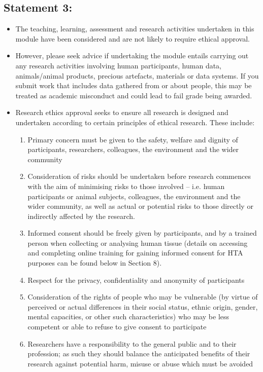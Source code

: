\documentclass{MDXHandbook}
\begin{document}
\subsection*{Statement 3:}
	\begin{itemize}
		\item The teaching, learning, assessment and research activities undertaken in this module have been considered and are not likely to require ethical approval. 
		\item However, please seek advice if undertaking the module entails carrying out any research activities involving human participants, human data, animals/animal products, precious artefacts, materials or data systems. If you submit work that includes data gathered from or about people, this may be treated as academic misconduct and could lead to fail grade being awarded. 
		\item Research ethics approval seeks to ensure all research is designed and undertaken according to certain principles of ethical research. These include: 
		\begin{enumerate}
			\item Primary concern must be given to the safety, welfare and dignity of participants, researchers, colleagues, the environment and the wider community 
			\item Consideration of risks should be undertaken before research commences with the aim of minimising risks to those involved – i.e. human participants or animal subjects, colleagues, the environment and the wider community, as well as actual or potential risks to those directly or indirectly affected by the research.
			\item Informed consent should be freely given by participants, and by a trained person when collecting or analysing human tissue (details on accessing and completing online training for gaining informed consent for HTA purposes can be found below in Section 8).
			\item Respect for the privacy, confidentiality and anonymity of participants 
			\item Consideration of the rights of people who may be vulnerable (by virtue of perceived or actual differences in their social status, ethnic origin, gender, mental capacities, or other such characteristics) who may be less competent or able to refuse to give consent to participate
			\item Researchers have a responsibility to the general public and to their profession; as such they should balance the anticipated benefits of their research against potential harm, misuse or abuse which must be avoided 

\end{enumerate}
\end{itemize}
\end{document}
